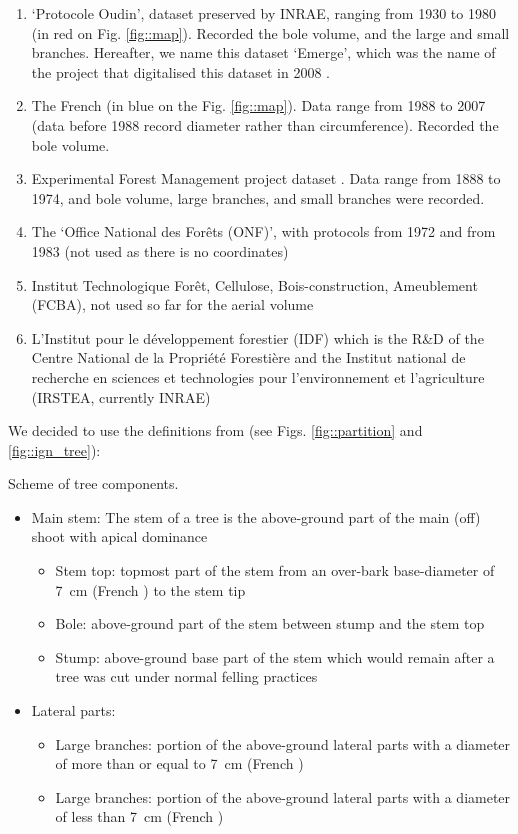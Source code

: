 \begin{enumerate}
	\item `Protocole Oudin', dataset preserved by INRAE, ranging from 1930 to 1980 (in red on Fig. \ref{fig::map}). Recorded the bole volume, and the large and small branches. Hereafter, we name this dataset `Emerge', which was the name of the project that digitalised this dataset in 2008 \parencite{Deleuze2013}.
	\item The French \NFI (in blue on the Fig. \ref{fig::map}). Data range from 1988 to 2007 (data before 1988 record diameter rather than circumference). Recorded the bole volume.
	\item Experimental Forest Management project dataset \parencite[in yello on Fig. \ref{fig::map}]{Didion2024}. Data range from 1888 to 1974, and bole volume, large branches, and small branches were recorded.
	\item The `Office National des Forêts (ONF)', with protocols from 1972 and from 1983 (not used as there is no coordinates)
	\item Institut Technologique Forêt, Cellulose, Bois-construction, Ameublement (FCBA), not used so far for the aerial volume
	\item L'Institut pour le développement forestier (IDF) which is the R\&D of the Centre National de la Propriété Forestière and the Institut national de recherche en sciences et technologies pour l'environnement et l'agriculture (IRSTEA, currently INRAE)
\end{enumerate}

We decided to use the definitions from \cite{Gschwantner2009} (see Figs. \ref{fig::partition} and \ref{fig::ign_tree}):

\begin{marginfigure}%
	
	\caption{Scheme of tree components.\label{fig::ign_tree}}
\end{marginfigure}

\begin{itemize}
	\item Main stem: The stem of a tree is the above-ground part of the main (off) shoot with apical dominance
	\begin{itemize}
		\item Stem top: topmost part of the stem from an over-bark base-diameter of \qty{7}{\centi\metre} (French \NFI) to the stem tip
		\item Bole: above-ground part of the stem between stump and the stem top
		\item Stump: above-ground base part of the stem which would remain after a tree was cut under normal felling practices
	\end{itemize}
	\item Lateral parts:
	\begin{itemize}
		\item Large branches: portion of the above-ground lateral parts with a diameter of more than or equal to \qty{7}{\centi\metre} (French \NFI)
		\item Large branches: portion of the above-ground lateral parts with a diameter of less than \qty{7}{\centi\metre} (French \NFI)
	\end{itemize}
\end{itemize}

